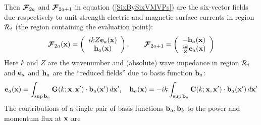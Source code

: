 \documentclass[letterpaper]{article}
\begin{document}
Then $\boldsymbol{\mathcal{F}}_{2a}$ and $\boldsymbol{\mathcal{F}}_{2a+1}$ in equation
(\ref{SixBySixVMVPs}) are the six-vector fields
due respectively to unit-strength electric and magnetic 
surface currents in region $\mathcal{R}_i$ (the region
containing the evaluation point):
\begin{align*}
  \boldsymbol{\mathcal{F}}_{2a}(\mathbf{x})
  = \left( \begin{array}{c}
    ikZ \mathbf{e}_a(\mathbf{x}) \\ \mathbf{h}_a(\mathbf{x})
    \end{array}\right), 
\qquad
  \boldsymbol{\mathcal{F}}_{2a+1} 
 = \left( \begin{array}{c}
    -\mathbf{h}_a(\mathbf{x}) \\ \frac{ik}{Z} \mathbf{e}_a(\mathbf{x})
    \end{array}\right)
\end{align*}
Here $k$ and $Z$ are the wavenumber and (absolute) 
wave impedance in region $\mathcal{R}_i$ and $\mathbf{e}_a$ and $\mathbf{h}_a$
are the ``reduced fields'' due to basis function $\mathbf{b}_a$:
$$ \mathbf{e}_a(\mathbf{x}) 
   =
   \int_{\sup \mathbf{b}_a} \mathbf{G}(k; \mathbf{x}, \mathbf{x}^\prime) 
                       \cdot \mathbf{b}_a (\mathbf{x}^\prime) 
   \, d\mathbf{x}^\prime,
   \quad
   \mathbf{h}_a(\mathbf{x}) 
   =
   -ik\int_{\sup \mathbf{b}_a} \mathbf{C}(k; \mathbf{x}, \mathbf{x}^\prime) 
                       \cdot \mathbf{b}_a (\mathbf{x}^\prime) 
   \, d\mathbf{x}^\prime
$$
The contributions of a single pair of basis functions
$\mathbf{b}_a, \mathbf{b}_b$ to the power and momentum flux
at $\mathbf{x}$ are
\end{document}
